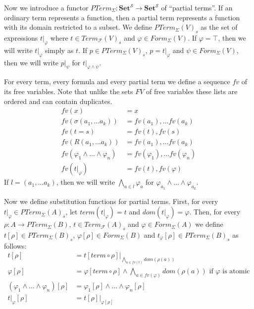 \documentclass[reqno]{amsart}
\theoremstyle{definition}
\theoremstyle{remark}
\newcommand{\cat}[1]{\mathbf{#1}}
\newcommand{\Set}{\cat{Set}}
\numberwithin{figure}{section}
\begin{document}
Now we introduce a functor $PTerm_\Sigma : \Set^\mathcal{S} \to \Set^\mathcal{S}$ of ``partial terms''.
If an ordinary term represents a function, then a partial term represents a function with its domain restricted to a subset.
We define $PTerm_\Sigma(V)_s$ as the set of expressions $t|_\varphi$ where $t \in Term_\mathcal{F}(V)_s$ and $\varphi \in Form_\Sigma(V)$.
If $\varphi = \top$, then we will write $t|_\varphi$ simply as $t$.
If $p \in PTerm_\Sigma(V)_s$, $p = t|_\varphi$ and $\psi \in Form_\Sigma(V)$, then we will write $p|_\psi$ for $t|_{\varphi \land \psi}$.

For every term, every formula and every partial term we define a sequence $fv$ of its free variables.
Note that unlike the sets $FV$ of free variables these lists are ordered and can contain duplicates.
\begin{align*}
fv(x) & = x \\
fv(\sigma(a_1, \ldots a_k)) & = fv(a_1), \ldots fv(a_k) \\
fv(t = s) & = fv(t), fv(s) \\
fv(R(a_1, \ldots a_k)) & = fv(a_1), \ldots fv(a_k) \\
fv(\varphi_1 \land \ldots \land \varphi_n) & = fv(\varphi_1), \ldots fv(\varphi_n) \\
fv(t|_\varphi) & = fv(t), fv(\varphi)
\end{align*}
If $l = (a_1, \ldots a_k)$, then we will write $\bigwedge_{a \in l} \varphi_a$ for $\varphi_{a_1} \land \ldots \land \varphi_{a_k}$.

Now we define substitution functions for partial terms.
First, for every $t|_\varphi \in PTerm_\Sigma(A)_s$, let $term(t|_\varphi) = t$ and $dom(t|_\varphi) = \varphi$.
Then, for every $\rho : A \to PTerm_\Sigma(B)$, $t \in Term_\mathcal{F}(A)_s$ and $\varphi \in Form_\Sigma(A)$
we define $t[\rho] \in PTerm_\Sigma(B)_s$, $\varphi[\rho] \in Form_\Sigma(B)$ and $t_\varphi[\rho] \in PTerm_\Sigma(B)_s$ as follows:
\begin{align*}
t[\rho] & = t[term \circ \rho]|_{\bigwedge_{a \in fv(t)} dom(\rho(a))} \\
\varphi[\rho] & = \varphi[term \circ \rho] \land \bigwedge_{a \in fv(\varphi)} dom(\rho(a)) \text{ if $\varphi$ is atomic} \\
(\varphi_1 \land \ldots \land \varphi_n)[\rho] & = \varphi_1[\rho] \land \ldots \land \varphi_n[\rho] \\
t|_\varphi[\rho] & = t[\rho]|_{\varphi[\rho]}
\end{align*}
\end{document}
